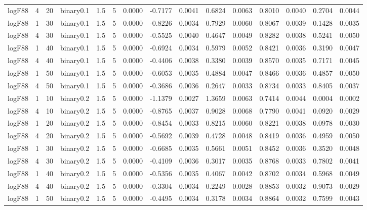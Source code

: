 \begin{longtable}{rrrrrrrrrrrrrrr}
  logF88 & 4 & 20 & binary0.1 & 1.5 & 5 & 0.0000 & -0.7177 & 0.0041 & 0.6824 & 0.0063 & 0.8010 & 0.0040 & 0.2704 & 0.0044 \\ 
  logF88 & 1 & 30 & binary0.1 & 1.5 & 5 & 0.0000 & -0.8226 & 0.0034 & 0.7929 & 0.0060 & 0.8067 & 0.0039 & 0.1428 & 0.0035 \\ 
  logF88 & 4 & 30 & binary0.1 & 1.5 & 5 & 0.0000 & -0.5525 & 0.0040 & 0.4647 & 0.0049 & 0.8282 & 0.0038 & 0.5241 & 0.0050 \\ 
  logF88 & 1 & 40 & binary0.1 & 1.5 & 5 & 0.0000 & -0.6924 & 0.0034 & 0.5979 & 0.0052 & 0.8421 & 0.0036 & 0.3190 & 0.0047 \\ 
  logF88 & 4 & 40 & binary0.1 & 1.5 & 5 & 0.0000 & -0.4406 & 0.0038 & 0.3380 & 0.0039 & 0.8570 & 0.0035 & 0.7171 & 0.0045 \\ 
  logF88 & 1 & 50 & binary0.1 & 1.5 & 5 & 0.0000 & -0.6053 & 0.0035 & 0.4884 & 0.0047 & 0.8466 & 0.0036 & 0.4857 & 0.0050 \\ 
  logF88 & 4 & 50 & binary0.1 & 1.5 & 5 & 0.0000 & -0.3686 & 0.0036 & 0.2647 & 0.0033 & 0.8734 & 0.0033 & 0.8405 & 0.0037 \\ 
  logF88 & 1 & 10 & binary0.2 & 1.5 & 5 & 0.0000 & -1.1379 & 0.0027 & 1.3659 & 0.0063 & 0.7414 & 0.0044 & 0.0004 & 0.0002 \\ 
  logF88 & 4 & 10 & binary0.2 & 1.5 & 5 & 0.0000 & -0.8765 & 0.0037 & 0.9028 & 0.0068 & 0.7790 & 0.0041 & 0.0920 & 0.0029 \\ 
  logF88 & 1 & 20 & binary0.2 & 1.5 & 5 & 0.0000 & -0.8454 & 0.0033 & 0.8215 & 0.0060 & 0.8221 & 0.0038 & 0.0978 & 0.0030 \\ 
  logF88 & 4 & 20 & binary0.2 & 1.5 & 5 & 0.0000 & -0.5692 & 0.0039 & 0.4728 & 0.0048 & 0.8419 & 0.0036 & 0.4959 & 0.0050 \\ 
  logF88 & 1 & 30 & binary0.2 & 1.5 & 5 & 0.0000 & -0.6685 & 0.0035 & 0.5661 & 0.0051 & 0.8452 & 0.0036 & 0.3520 & 0.0048 \\ 
  logF88 & 4 & 30 & binary0.2 & 1.5 & 5 & 0.0000 & -0.4109 & 0.0036 & 0.3017 & 0.0035 & 0.8768 & 0.0033 & 0.7802 & 0.0041 \\ 
  logF88 & 1 & 40 & binary0.2 & 1.5 & 5 & 0.0000 & -0.5356 & 0.0035 & 0.4067 & 0.0042 & 0.8702 & 0.0034 & 0.5968 & 0.0049 \\ 
  logF88 & 4 & 40 & binary0.2 & 1.5 & 5 & 0.0000 & -0.3304 & 0.0034 & 0.2249 & 0.0028 & 0.8853 & 0.0032 & 0.9073 & 0.0029 \\ 
  logF88 & 1 & 50 & binary0.2 & 1.5 & 5 & 0.0000 & -0.4495 & 0.0034 & 0.3178 & 0.0034 & 0.8864 & 0.0032 & 0.7599 & 0.0043 \\ 

\end{longtable}
